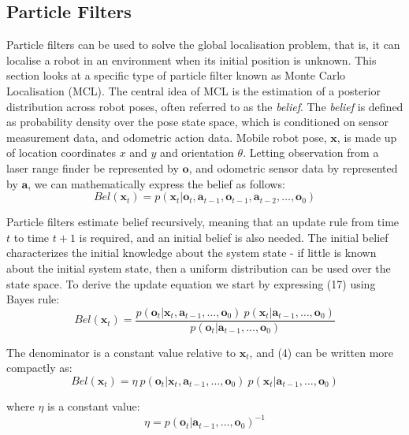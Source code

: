 \documentclass[a4paper]{article}
\begin{document}
\pagebreak

\subsection{Particle Filters}
Particle filters can be used to solve the global localisation problem, that is, it can localise a robot in an environment when its initial position is unknown. This section looks at a specific type of particle filter known as Monte Carlo Localisation (MCL). The central idea of MCL is the estimation of a posterior distribution across robot poses, often referred to as the \textit{belief}. The \textit{belief} is defined as probability density over the pose state space, which is conditioned on sensor measurement data, and odometric action data. Mobile robot pose, $\mathbf{x}$, is made up of location coordinates $x$ and $y$ and orientation $\theta$. Letting observation from a laser range finder be represented by $\mathbf{o}$, and odometric sensor data by represented by $\mathbf{a}$, we can mathematically express the belief as follows:
\begin{equation}
Bel(\mathbf{x}_t) = p(\mathbf{x}_t | \mathbf{o}_t, \mathbf{a}_{t-1}, \mathbf{o}_{t-1}, \mathbf{a}_{t-2},\ldots,\mathbf{o}_0)
\end{equation}

Particle filters estimate belief recursively, meaning that an update rule from time $t$ to time $t+1$ is required, and an initial belief is also needed. The initial belief characterizes the initial knowledge about the system state - if little is known about the initial system state, then a uniform distribution can be used over the state space. To derive the update equation we start by expressing (17) using Bayes rule:
\begin{equation}
Bel(\mathbf{x}_t) = \frac{p(\mathbf{o}_t | \mathbf{x}_t,\mathbf{a}_{t-1},\ldots,\mathbf{o}_0) \ p(\mathbf{x}_t | \mathbf{a}_{t-1},\ldots,\mathbf{o}_0)}{p(\mathbf{o}_t | \mathbf{a}_{t-1},\ldots,\mathbf{o}_0)}
\end{equation}

The denominator is a constant value relative to $\mathbf{x}_t$, and (4) can be written more compactly as:
\begin{equation}
Bel(\mathbf{x}_t) = \eta \ p(\mathbf{o}_t | \mathbf{x}_t,\mathbf{a}_{t-1},\ldots,\mathbf{o}_0) \ p(\mathbf{x}_t | \mathbf{a}_{t-1},\ldots,\mathbf{o}_0)
\end{equation}

where $\eta$ is a constant value:
\begin{equation}
\eta = p(\mathbf{o}_t | \mathbf{a}_{t-1},\ldots,\mathbf{o}_0)^{-1}
\end{equation}
\end{document}
